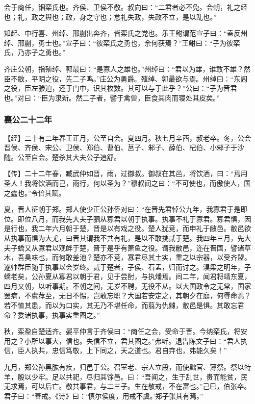 \documentclass[]{article}
\begin{document}
会于商任，锢栾氏也。齐侯、卫侯不敬。叔向曰：``二君者必不免。会朝，礼之经也；礼，政之舆也；政，身之守也；怠礼失政，失政不立，是以乱也。''

知起、中行喜、州绰、邢蒯出奔齐，皆栾氏之党也。乐王鲋谓范宣子曰：``盍反州绰、邢蒯，勇士也。''宣子曰：``彼栾氏之勇也，余何获焉？''王鲋曰：``子为彼栾氏，乃亦子之勇也。''

齐庄公朝，指殖绰、郭最曰：``是寡人之雄也。''州绰曰：``君以为雄，谁敢不雄？然臣不敏，平阴之役，先二子鸣。''庄公为勇爵。殖绰、郭最欲与焉。州绰曰：``东闾之役，臣左骖迫，还于门中，识其枚数。其可以与于此乎？''公曰：``子为晋君也。''对曰：``臣为隶新。然二子者，譬于禽兽，臣食其肉而寝处其皮矣。''

\hypertarget{header-n2122}{%
\subsubsection{襄公二十二年}\label{header-n2122}}

【经】二十有二年春王正月，公至自会。夏四月。秋七月辛酉，叔老卒。冬，公会晋侯、齐侯、宋公、卫侯、郑伯、曹伯、莒子、邾子、薛伯、杞伯、小邾子于沙随。公至自会。楚杀其大夫公子追舒。

【传】二十二年春，臧武仲如晋，雨，过御叔。御叔在其邑，将饮酒，曰：``焉用圣人！我将饮酒而己，雨行，何以圣为？''穆叔闻之曰：``不可使也，而傲使人，国之蠹也。''令倍其赋。

夏，晋人征朝于郑。郑人使少正公孙侨对曰：``在晋先君悼公九年，我寡君于是即位。即位八月，而我先大夫子驷从寡君以朝于执事。执事不礼于寡君。寡君惧，因是行也，我二年六月朝于楚，晋是以有戏之役。楚人犹竞，而申礼于敝邑。敝邑欲从执事而惧为大尤，曰晋其谓我不共有礼，是以不敢携贰于楚。我四年三月，先大夫子蟜又从寡君以观衅于楚，晋于是乎有萧鱼之役。谓我敝邑，迩在晋国，譬诸草木，吾臭味也，而何敢差池？楚亦不竞，寡君尽其土实，重之以宗器，以受齐盟。遂帅群臣随于执事以会岁终。贰于楚者，子侯、石盂，归而讨之。湨梁之明年，子蟜老矣，公孙夏从寡君以朝于君，见于尝酎，与执燔焉。间二年，闻君将靖东夏，四月又朝，以听事期。不朝之间，无岁不聘，无役不从。以大国政令之无常，国家罢病，不虞荐至，无日不惕，岂敢忘职？大国若安定之，其朝夕在庭，何辱命焉？若不恤其患，而以为口实，其无乃不堪任命，而翦为仇雠，敝邑是惧。其敢忘君命？委诸执事，执事实重图之。''

秋，栾盈自楚适齐。晏平仲言于齐侯曰：``商任之会，受命于晋。今纳栾氏，将安用之？小所以事大，信也。失信不立，君其图之。''弗听。退告陈文子曰：``君人执信，臣人执共，忠信笃敬，上下同之，天之道也。君自弃也，弗能久矣！''

九月，郑公孙黑肱有疾，归邑于公。召室老、宗人立段，而使黜官、薄祭。祭以特羊，殷以少牢。足以共祀，尽归其馀邑。曰：``吾闻之，生于乱世，贵而能贫，民无求焉，可以后亡。敬共事君，与二三子。生在敬戒，不在富也。''己巳，伯张卒。君子曰：``善戒。《诗》曰：`慎尔侯度，用戒不虞。'郑子张其有焉。''
\end{document}
